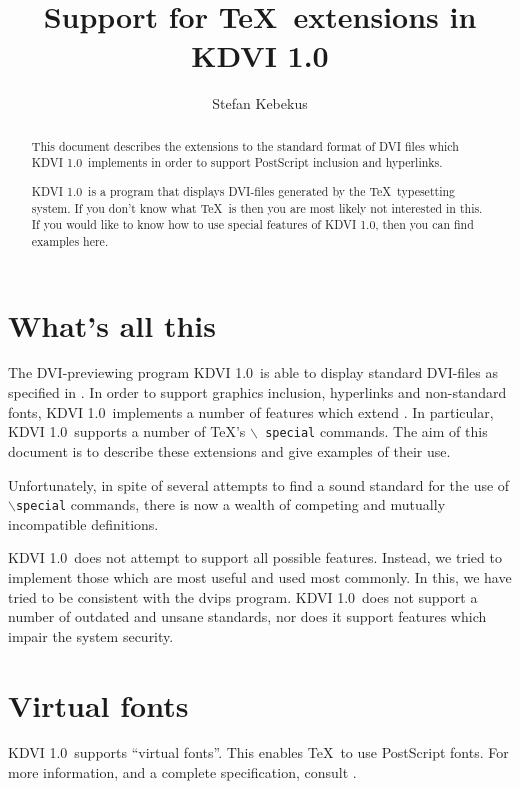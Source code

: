 \documentclass{article}
\newcommand{\KDVI}{{\sf KDVI 1.0}}
\begin{document}
\title{Support for \TeX\ extensions in \KDVI}

\author{Stefan Kebekus}

\maketitle
\begin{abstract}
  This document describes the extensions to the standard format of DVI
  files which \KDVI\ implements in order to support PostScript
  inclusion and hyperlinks.
  
  \KDVI\ is a program that displays DVI-files generated by the \TeX\ 
  typesetting system. If you don't know what \TeX\ is then you are
  most likely not interested in this. If you would like to know how to
  use special features of \KDVI, then you can find examples here.
\end{abstract}

\tableofcontents

\section{What's all this}

The DVI-previewing program \KDVI\ is able to display standard
DVI-files as specified in \cite{Level0Std}. In order to support
graphics inclusion, hyperlinks and non-standard fonts, \KDVI\ 
implements a number of features which extend \cite{Level0Std}. In
particular, \KDVI\ supports a number of \TeX 's $\backslash${\tt
  special} commands. The aim of this document is to describe these
extensions and give examples of their use.

Unfortunately, in spite of several attempts to find a sound standard
for the use of $\backslash${\tt special} commands, there is now a
wealth of competing and mutually incompatible definitions.

\KDVI\ does not attempt to support all possible features. Instead, we
tried to implement those which are most useful and used most commonly.
In this, we have tried to be consistent with the {\sf dvips} program.
\KDVI\ does not support a number of outdated and unsane standards, nor
does it support features which impair the system security.


\section{Virtual fonts}

\KDVI\ supports ``virtual fonts''. This enables \TeX\ to use
PostScript fonts. For more information, and a complete specification,
consult \cite{dvips}.
\end{document}
